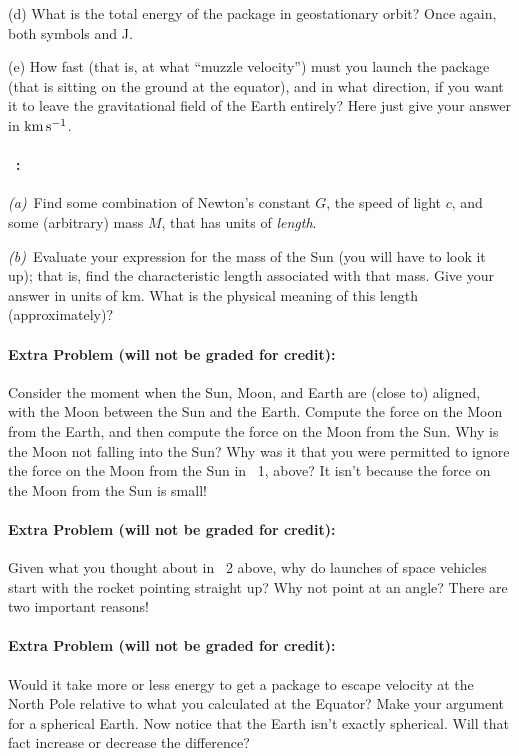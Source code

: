 \documentclass[12pt]{article}
\begin{document}
(d) What is the total energy of the package in geostationary
orbit? Once again, both symbols and J.

(e) How fast (that is, at what ``muzzle velocity'') must you launch
the package (that is sitting on the ground at the equator), and in what direction, if
you want it to leave the gravitational field of the Earth entirely?
Here just give your answer in $\mathrm{km}\,\mathrm{s}^{-1}$.

\paragraph{\problemname~\theproblem:}%
\textsl{(a)}~Find some combination of Newton's constant $G$, the speed of light $c$, and
some (arbitrary) mass $M$, that has units of \emph{length}.

\textsl{(b)}~Evaluate your expression for the mass of the Sun (you
will have to look it up); that is, find the characteristic length
associated with that mass.  Give your answer in units of km.  What is
the physical meaning of this length (approximately)?

\paragraph{Extra Problem (will not be graded for credit):}%
Consider the moment when the Sun, Moon, and Earth are (close to)
aligned, with the Moon between the Sun and the Earth. Compute the
force on the Moon from the Earth, and then compute the force on the
Moon from the Sun. Why is the Moon not falling into the Sun? Why was
it that you were permitted to ignore the force on the Moon from the
Sun in \problemname~1, above? It isn't because the force on the
Moon from the Sun is small!

\paragraph{Extra Problem (will not be graded for credit):}%
Given what you thought about in \problemname~2 above, why do launches
of space vehicles start with the rocket pointing straight up? Why not
point at an angle? There are two important reasons!

\paragraph{Extra Problem (will not be graded for credit):}%
Would it take more or less energy to get a package to escape velocity
at the North Pole relative to what you calculated at the Equator? Make
your argument for a spherical Earth. Now notice that the Earth isn't
exactly spherical. Will that fact increase or decrease the difference?
\end{document}
